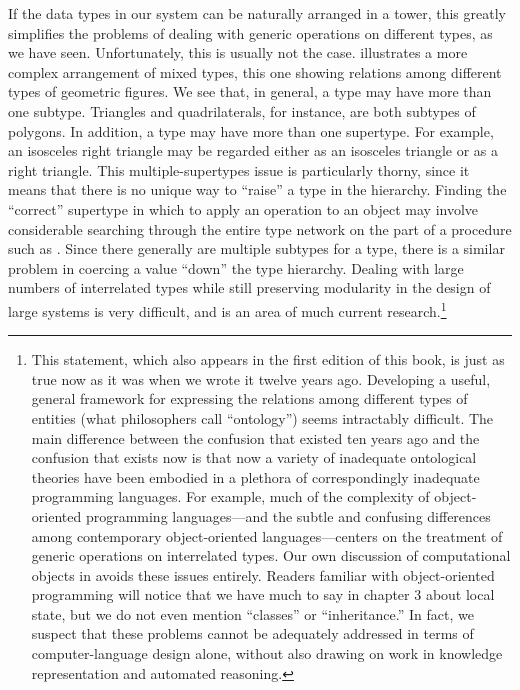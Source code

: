 If the data types in our system can be naturally arranged in a tower, this
greatly simplifies the problems of dealing with generic operations on different
types, as we have seen.  Unfortunately, this is usually not the case.
 illustrates a more complex arrangement of mixed types, this
one showing relations among different types of geometric figures.  We see that,
in general, a type may have more than one subtype.  Triangles and
quadrilaterals, for instance, are both subtypes of polygons.  In addition, a
type may have more than one supertype.  For example, an isosceles right
triangle may be regarded either as an isosceles triangle or as a right
triangle.  This multiple-supertypes issue is particularly thorny, since it
means that there is no unique way to ``raise'' a type in the hierarchy.
Finding the ``correct'' supertype in which to apply an operation to an object
may involve considerable searching through the entire type network on the part
of a procedure such as .  Since there generally are
multiple subtypes for a type, there is a similar problem in coercing a value
``down'' the type hierarchy.  Dealing with large numbers of interrelated types
while still preserving modularity in the design of large systems is very
difficult, and is an area of much current research.\footnote{This statement,
which also appears in the first edition of this book, is just as true now as it
was when we wrote it twelve years ago.  Developing a useful, general framework
for expressing the relations among different types of entities (what
philosophers call ``ontology'') seems intractably difficult.  The main
difference between the confusion that existed ten years ago and the confusion
that exists now is that now a variety of inadequate ontological theories have
been embodied in a plethora of correspondingly inadequate programming
languages.  For example, much of the complexity of object-oriented programming
languages---and the subtle and confusing differences among contemporary
object-oriented languages---centers on the treatment of generic operations on
interrelated types.  Our own discussion of computational objects in
 avoids these issues entirely.  Readers familiar with
object-oriented programming will notice that we have much to say in
chapter 3 about local state, but we do not even mention ``classes'' or
``inheritance.''  In fact, we suspect that these problems cannot be adequately
addressed in terms of computer-language design alone, without also drawing on
work in knowledge representation and automated reasoning.}

